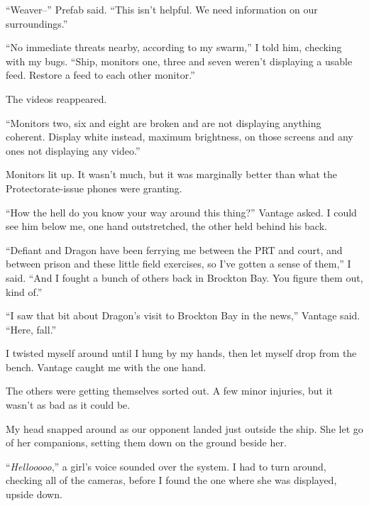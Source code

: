 ``Weaver--'' Prefab said.  ``This isn't helpful.  We need information on our surroundings.''



``No immediate threats nearby, according to my swarm,'' I told him, checking with my bugs.  ``Ship, monitors one, three and seven weren't displaying a usable feed.  Restore a feed to each other monitor.''



The videos reappeared.



``Monitors two, six and eight are broken and are not displaying anything coherent.  Display white instead, maximum brightness, on those screens and any ones not displaying any video.''



Monitors lit up.  It wasn't much, but it was marginally better than what the Protectorate-issue phones were granting.



``How the hell do you know your way around this thing?''  Vantage asked.  I could see him below me, one hand outstretched, the other held behind his back.



``Defiant and Dragon have been ferrying me between the PRT and court, and between prison and these little field exercises, so I've gotten a sense of them,'' I said.  ``And I fought a bunch of others back in Brockton Bay.  You figure them out, kind of.''



``I saw that bit about Dragon's visit to Brockton Bay in the news,'' Vantage said.  ``Here, fall.''



I twisted myself around until I hung by my hands, then let myself drop from the bench.  Vantage caught me with the one hand.



The others were getting themselves sorted out.  A few minor injuries, but it wasn't as bad as it could be.



My head snapped around as our opponent landed just outside the ship.  She let go of her companions, setting them down on the ground beside her.



``\emph{Hellooooo},'' a girl's voice sounded over the system.  I had to turn around, checking all of the cameras, before I found the one where she was displayed, upside down.



